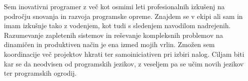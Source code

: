 

\begin{cvparagraph}

Sem inovativni programer z več kot osmimi leti profesionalnih izkušenj 
na področju snovanja in razvoja programske opreme.
Znajdem se v ekipi ali sam in imam izkušnje tako z vodenjem, 
kot tudi s sledenjem navodilom nadrejenih.
Razumevanje zapletenih sistemov in reševanje kompleksnih problemov 
na dinamičen in produktiven način je ena izmed mojih vrlin.
Zmožen sem koordinacije več projektov hkrati ter samoiniciativen 
pri izbiri nalog.
Ciljam biti kar se da neodvisen od programskih jezikov, 
z veseljem pa se učim novih jezikov ter programskih ogrodij.
\end{cvparagraph}

